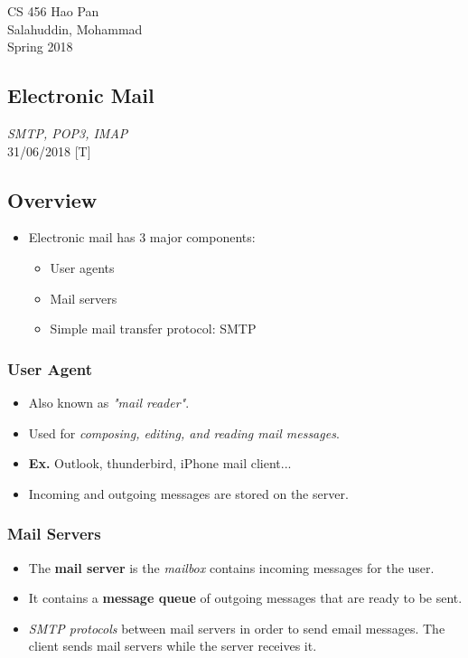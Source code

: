 \documentclass{article}
\begin{document}
\noindent
{CS 456 \hfill Hao Pan}\\
{Salahuddin, Mohammad}\\
{Spring 2018}


\begin{center}
\section{Electronic Mail}
\vspace{-4mm}
{\it SMTP, POP3, IMAP}\\
\noindent
{\hfill 31/06/2018 [T]}
\end{center}

\subsection{Overview}

\begin{itemize}
\item Electronic mail has 3 major components:
\begin{itemize}
\item User agents
\item Mail servers
\item Simple mail transfer protocol: SMTP
\end{itemize}
\end{itemize}

\subsubsection{User Agent}

\begin{itemize}
\item Also known as {\it "mail reader"}.
\item Used for {\it composing, editing, and reading mail messages}.
\item {\bf Ex.} Outlook, thunderbird, iPhone mail client...
\item Incoming and outgoing messages are stored on the server.
\end{itemize}

\subsubsection{Mail Servers}

\begin{itemize}
\item The {\bf mail server} is the {\it mailbox} contains incoming messages for the user.
\item It contains a {\bf message queue} of outgoing messages that are ready to be sent.
\item {\it SMTP protocols} between mail servers in order to send email messages. The client sends mail servers while the server receives it.
\end{itemize}
\end{document}
